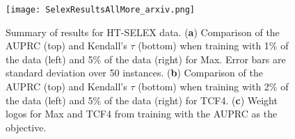 \documentclass[aps,pra,groupedaddress,nofootinbib,notitlepage,showpacs,floatfix,superscriptaddress]{revtex4-1}
\begin{document}
\begin{figure}[htp]
\texttt{[image: SelexResultsAllMore\_arxiv.png]}
\caption{Summary of results for HT-SELEX data. (\textbf{a}) Comparison of the AUPRC (top) and Kendall's $\tau$ (bottom) when training with 1\% of the data (left) and 5\% of the data (right) for Max. Error bars are standard deviation over 50 instances.  (\textbf{b}) Comparison of the AUPRC (top) and Kendall's $\tau$ (bottom) when training with 2\% of the data (left) and 5\% of the data (right) for TCF4. (\textbf{c}) Weight logos for Max and TCF4 from training with the AUPRC as the objective.
}
\label{fig:SelexAllResults}
\end{figure}
\end{document}
